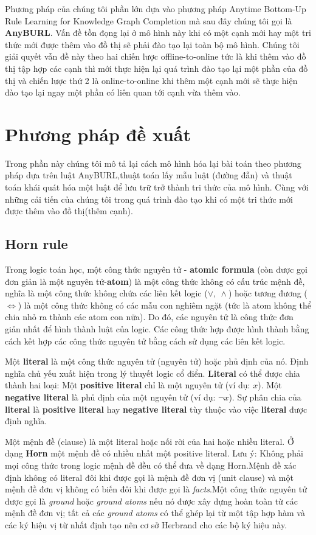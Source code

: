 Phương pháp của chúng tôi phần lớn dựa vào phương pháp Anytime Bottom-Up Rule Learning for Knowledge Graph Completion \cite{meilicke2019anytime} mà sau đây chúng tôi gọi là \textbf{AnyBURL}. Vấn đề tồn đọng lại ở mô hình này khi có một cạnh mới hay một tri thức mới được thêm vào đồ thị sẽ phải đào tạo lại toàn bộ mô hình. Chúng tôi giải quyết vẫn đề này theo hai chiến lược offline-to-online tức là khi thêm vào đồ thị tập hợp các cạnh thì mới thực hiện lại quá trình đào tạo lại một phần của đồ thị và chiến lược thứ 2 là online-to-online  khi thêm một cạnh mới sẽ thực hiện đào tạo lại ngay một phần có liên quan tới cạnh vừa thêm vào.
\section{Phương pháp đề xuất}
Trong phần này chúng tôi mô tả lại cách mô hình hóa lại bài toán theo phương pháp dựa trên luật AnyBURL,thuật toán lấy mẫu luật (đường đẫn) và thuật toán khái quát hóa một luật để lưu trữ trở thành tri thức của mô hình. Cùng với những cải tiến của chúng tôi trong quá trình đào tạo khi có một tri thức mới được thêm vào đồ thị(thêm cạnh).

\subsection{Horn rule}
Trong logic toán học, một công thức nguyên tử - \textbf{atomic formula}\cite{wiki:Atomic} (còn được gọi đơn giản là một nguyên tử-\textbf{atom}) là một công thức không có cấu trúc mệnh đề, nghĩa là một công thức không chứa các liên kết logic (\(\vee, ~ \wedge\)) hoặc tương đương (\(\Leftrightarrow\)) là một công thức không có các mẫu con nghiêm ngặt (tức là atom không thể chia nhỏ ra thành các atom con nữa). Do đó, các nguyên tử là công thức đơn giản nhất để hình thành luật của logic. Các công thức hợp được hình thành bằng cách kết hợp các công thức nguyên tử bằng cách sử dụng các liên kết logic.

Một \textbf{literal}\cite{wiki:Literal} là một công thức nguyên tử (nguyên tử) hoặc phủ định của nó. Định nghĩa chủ yếu xuất hiện trong lý thuyết logic cổ điển. \textbf{Literal} có thể được chia thành hai loại: Một \textbf{positive literal} chỉ là một nguyên tử (ví dụ: \(x\)). Một \textbf{negative literal} là phủ định của một nguyên tử (ví dụ: \(\neg x\)). Sự phân chia của \textbf{literal} là \textbf{positive literal} hay \textbf{negative literal} tùy thuộc vào việc \textbf{literal} được định nghĩa.

Một mệnh đề (clause) là một literal hoặc nối rời của hai hoặc nhiều literal. Ở dạng \textbf{Horn} một mệnh đề có nhiều nhất một positive literal. Lưu ý: Không phải mọi công thức trong logic mệnh đề đều có thể đưa về dạng Horn.Mệnh đề xác định không có literal đôi khi được gọi là mệnh đề đơn vị (unit clause) và một mệnh đề đơn vị không có biến đôi khi được gọi là \textit{facts}\cite{wiki:Horn}.Một công thức nguyên tử được gọi là \textit{ground} hoặc \textit{ground atoms} nếu nó được xây dựng hoàn toàn từ các mệnh đề đơn vị; tất cả các \textit{ground atoms} có thể ghép lại từ một tập hợp hàm và các ký hiệu vị từ nhất định tạo nên cơ sở Herbrand cho các bộ ký hiệu này\cite{wiki:Term}.

